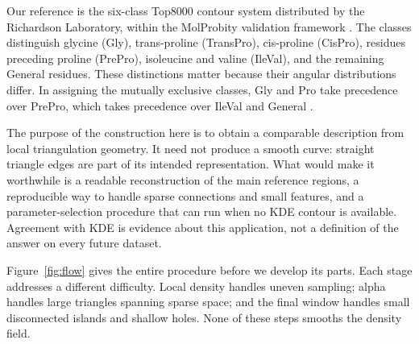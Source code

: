 \documentclass[11pt]{article}
\begin{document}
Our reference is the six-class Top8000 contour system distributed by the
Richardson Laboratory, within the MolProbity validation framework
\citep{williams2018,top8000data}. The classes distinguish glycine (Gly),
trans-proline (TransPro), cis-proline (CisPro), residues preceding proline
(PrePro), isoleucine and valine (IleVal), and the remaining General residues.
These distinctions matter because their angular distributions differ. In
assigning the mutually exclusive classes, Gly and Pro take precedence over
PrePro, which takes precedence over IleVal and General
\citep{read2011}.

The purpose of the construction here is to obtain a comparable description
from local triangulation geometry. It need not produce a smooth curve:
straight triangle edges are part of its intended representation. What would
make it worthwhile is a readable reconstruction of the main reference
regions, a reproducible way to handle sparse connections and small features,
and a parameter-selection procedure that can run when no KDE contour is
available. Agreement with KDE is evidence about this application, not a
definition of the answer on every future dataset.

Figure~\ref{fig:flow} gives the entire procedure before we develop its parts.
Each stage addresses a different difficulty. Local density handles uneven
sampling; alpha handles large triangles spanning sparse space; and the final
window handles small disconnected islands and shallow holes. None of these
steps smooths the density field.
\end{document}
